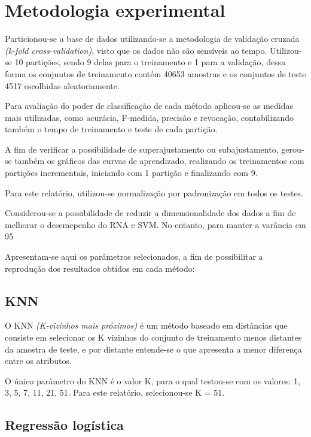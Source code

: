 \section{Metodologia experimental}

Particionou-se a base de dados utilizando-se a metodologia de validação cruzada \emph{(k-fold cross-validation)}, visto que os dados não são sensíveis ao tempo. Utilizou-se 10 partições, sendo 9 delas para o treinamento e 1 para a validação, dessa forma os conjuntos de treinamento contém 40653 amostras e os conjuntos de teste 4517 escolhidas aleatoriamente.

Para avaliação do poder de classificação de cada método aplicou-se as medidas mais utilizadas, como acurácia, F-medida, precisão e revocação, contabilizando também o tempo de treinamento e teste de cada partição.

A fim de verificar a possibilidade de superajustamento ou subajustamento, gerou-se também os gráficos das curvas de aprendizado, realizando os treinamentos com partições incrementais, iniciando com 1 partição e finalizando com 9.

Para este relatório, utilizou-se normalização por padronização em todos os testes.

Considerou-se a possibilidade de reduzir a dimensionalidade dos dados a fim de melhorar o desemepenho do RNA e SVM.  No entanto, para manter a varância em 95%

Apresentam-se aqui os parâmetros selecionados, a fim de possibilitar a reprodução dos resultados obtidos em cada método:

\subsection{KNN}

O KNN \emph{(K-vizinhos mais próximos)} é um método baseado em distâncias que consiste em selecionar os K vizinhos do conjunto de treinamento menos distantes da amostra de teste, e por distante entende-se o que apresenta a menor diferença entre os atributos.

O único parâmetro do KNN é o valor K, para o qual testou-se com os valores: 1, 3, 5, 7, 11, 21, 51. Para este relatório, selecionou-se K = 51.

\subsection{Regressão logística}

